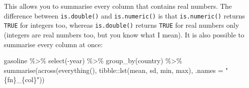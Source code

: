 \documentclass[
]{article}
\newenvironment{Shaded}{\begin{snugshade}}{\end{snugshade}}
\newcommand{\AttributeTok}[1]{\textcolor[rgb]{0.77,0.63,0.00}{#1}}
\newcommand{\FunctionTok}[1]{\textcolor[rgb]{0.00,0.00,0.00}{#1}}
\newcommand{\NormalTok}[1]{#1}
\newcommand{\SpecialCharTok}[1]{\textcolor[rgb]{0.00,0.00,0.00}{#1}}
\newcommand{\StringTok}[1]{\textcolor[rgb]{0.31,0.60,0.02}{#1}}
\begin{document}
This allows you to summarise every column that contains real numbers. The difference between
\texttt{is.double()} and \texttt{is.numeric()} is that \texttt{is.numeric()} returns \texttt{TRUE} for integers too, whereas
\texttt{is.double()} returns \texttt{TRUE} for real numbers only (integers are real numbers too, but you know
what I mean). It is also possible to summarise every column at once:

\begin{Shaded}
\begin{Highlighting}[]
\NormalTok{gasoline }\SpecialCharTok{\%\textgreater{}\%}
  \FunctionTok{select}\NormalTok{(}\SpecialCharTok{{-}}\NormalTok{year) }\SpecialCharTok{\%\textgreater{}\%}
  \FunctionTok{group\_by}\NormalTok{(country) }\SpecialCharTok{\%\textgreater{}\%}
  \FunctionTok{summarise}\NormalTok{(}\FunctionTok{across}\NormalTok{(}\FunctionTok{everything}\NormalTok{(), tibble}\SpecialCharTok{::}\FunctionTok{lst}\NormalTok{(mean, sd, min, max), }\AttributeTok{.names =} \StringTok{"\{fn\}\_\{col\}"}\NormalTok{))}
\end{Highlighting}
\end{Shaded}
\end{document}
